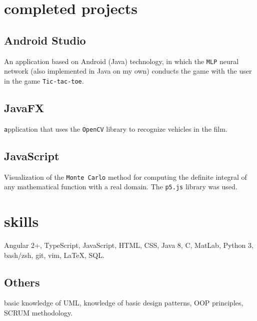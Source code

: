 \documentclass{article}
\begin{document}
\begin{minipage}[t]{.4\textwidth}

	\section{completed projects}
	\subsection{Android Studio}
    An application based on Android (Java) technology, in which the \texttt{MLP} neural network (also implemented in Java on my own) conducts the game with the user in the game \texttt{Tic-tac-toe}.

	\subsection{JavaFX}
	\texttt application that uses the \texttt{OpenCV} library to recognize vehicles in the film.

	\subsection{JavaScript}
    Visualization of the \texttt{Monte Carlo} method for computing the definite integral of any mathematical function with a real domain. The \texttt{p5.js} library was used.

	\vspace{1em}

	\section{skills}
    \vspace{1em}
	Angular 2+, TypeScript, JavaScript, HTML, CSS, Java 8, C, MatLab, Python 3, bash/zsh, git, vim, \LaTeX, SQL.

	\subsection{Others}
	basic knowledge of UML, knowledge of basic design patterns, OOP principles, SCRUM methodology.


\end{minipage}
\end{document}
